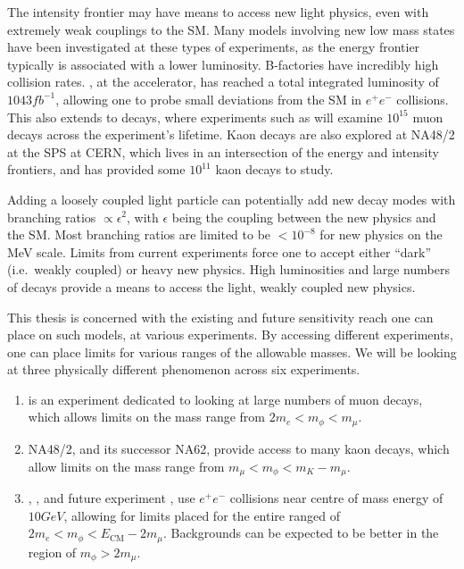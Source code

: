 \label{chapter:experiments}

The intensity frontier may have means to access new light physics, even with extremely weak couplings to the SM.
Many models involving new low mass states have been investigated at these types of experiments, as the energy frontier typically is associated with a lower luminosity.
B-factories have incredibly high collision rates.
\belle, at the \kekb accelerator, has reached a total integrated luminosity of $1043fb^{-1}$, allowing one to probe small deviations from the SM in $e^+ e^-$ collisions.
This also extends to decays, where experiments such as \mueee will examine $10^{15}$ muon decays across the experiment's lifetime.
Kaon decays are also explored at NA48/2 at the SPS at CERN, which lives in an intersection of the energy and intensity frontiers, and has provided some $10^{11}$ kaon decays to study.

Adding a loosely coupled light particle can potentially add new decay modes with branching ratios $\propto \epsilon^2$, with $\epsilon$ being the coupling between the new physics and the SM.
Most branching ratios are limited to be $< 10^{-8}$ for new physics on the MeV scale.
Limits from current experiments force one to accept either ``dark'' (i.e.\ weakly coupled) or heavy new physics.
High luminosities and large numbers of decays provide a means to access the light, weakly coupled new physics.

This thesis is concerned with the existing and future sensitivity reach one can place on such models, at various experiments.
By accessing different experiments, one can place limits for various ranges of the allowable masses.
We will be looking at three physically different phenomenon across six experiments.
\begin{enumerate}
    \item \mueee is an experiment dedicated to looking at large numbers of muon decays, which allows limits on the mass range from $2 m_e < m_\phi < m_\mu$.
    \item NA48/2, and its successor NA62, provide access to many kaon decays, which allow limits on the mass range from $m_\mu < m_\phi < m_K - m_\mu$.
    \item \babar, \belle, and future experiment \belletwo, use $e^+ e^-$ collisions near centre of mass energy of $10GeV$, allowing for limits placed for the entire ranged of $2m_e < m_\phi < E_\textrm{CM} - 2 m_\mu$. Backgrounds can be expected to be better in the region of $m_\phi > 2 m_\mu$.
\end{enumerate}




